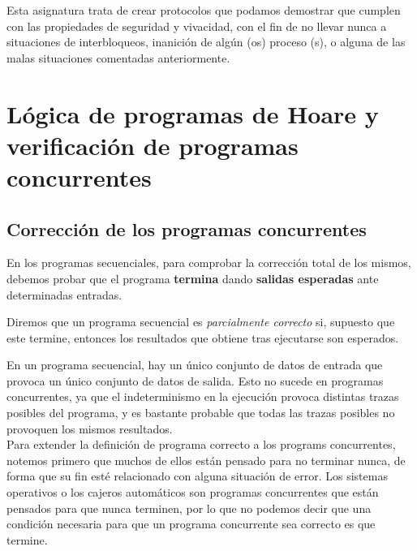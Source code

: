 Esta asignatura trata de crear protocolos que podamos demostrar que cumplen con las propiedades de seguridad y vivacidad, con el fin de no llevar nunca a situaciones de interbloqueos, inanición de algún (os) proceso (s), o alguna de las malas situaciones comentadas anteriormente.

\section{Lógica de programas de Hoare y verificación de programas concurrentes}
\subsection{Corrección de los programas concurrentes}
En los programas secuenciales, para comprobar la corrección total de los mismos, debemos probar que el programa \textbf{termina} dando \textbf{salidas esperadas} ante determinadas entradas.

Diremos que un programa secuencial es \textit{parcialmente correcto} si, supuesto que este termine, entonces los resultados que obtiene tras ejecutarse son esperados.

En un programa secuencial, hay un único conjunto de datos de entrada que provoca un único conjunto de datos de salida. Esto no sucede en programas concurrentes, ya que el indeterminismo en la ejecución provoca distintas trazas posibles del programa, y es bastante probable que todas las trazas posibles no provoquen los mismos resultados.\\

Para extender la definición de programa correcto a los programs concurrentes, notemos primero que muchos de ellos están pensado para no terminar nunca, de forma que su fin esté relacionado con alguna situación de error. Los sistemas operativos o los cajeros automáticos son programas concurrentes que están pensados para que nunca terminen, por lo que no podemos decir que una condición necesaria para que un programa concurrente sea correcto es que termine.\\

